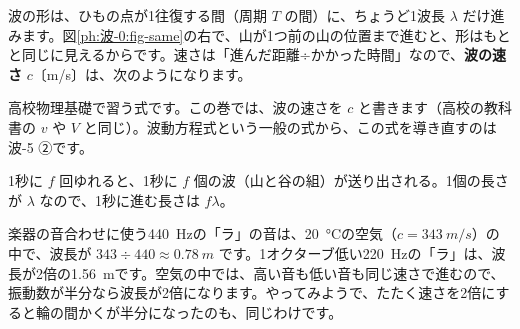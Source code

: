 波の形は、ひもの点が1往復する間（周期 $T$ の間）に、ちょうど1波長 $\lambda$ だけ進みます。図\ref{ph:波-0:fig-same}の右で、山が1つ前の山の位置まで進むと、形はもとと同じに見えるからです。速さは「進んだ距離÷かかった時間」なので、\textbf{波の速さ} $c$〔m/s〕は、次のようになります。
\begin{phflow}[ゆれから波の速さへ]
\end{phflow}
\label{ph:波-0:cfl}高校物理基礎で習う式です。この巻では、波の速さを $c$ と書きます（高校の教科書の $v$ や $V$ と同じ）。波動方程式という一般の式から、この式を導き直すのは波-5 ②です。
\begin{phyomi}[$c=f\lambda$]
1秒に $f$ 回ゆれると、1秒に $f$ 個の波（山と谷の組）が送り出される。1個の長さが $\lambda$ なので、1秒に進む長さは $f\lambda$。
\end{phyomi}
\begin{phmijika}
楽器の音合わせに使う\qty{440}{Hz}の「ラ」の音は、\qty{20}{\celsius}の空気（$c=\qty{343}{m/s}$）の中で、波長が $343\div440\approx\qty{0.78}{m}$ です。1オクターブ低い\qty{220}{Hz}の「ラ」は、波長が2倍の\qty{1.56}{m}です。空気の中では、高い音も低い音も同じ速さで進むので、振動数が半分なら波長が2倍になります。やってみようで、たたく速さを2倍にすると輪の間かくが半分になったのも、同じわけです。
\end{phmijika}

